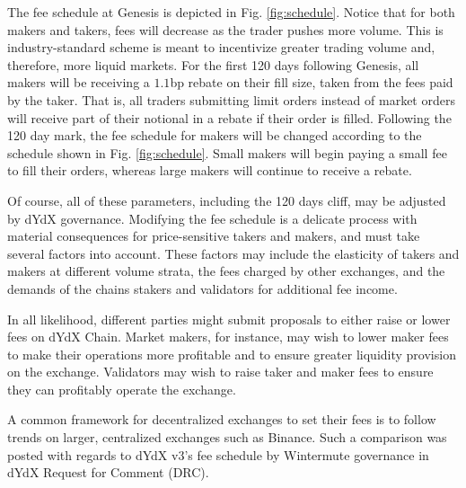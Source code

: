             The fee schedule at Genesis is depicted in Fig. \ref{fig:schedule}. Notice that for both makers and takers, fees will decrease as the trader pushes more volume. This is industry-standard scheme is meant to incentivize greater trading volume and, therefore, more liquid markets. For the first 120 days following Genesis, all makers will be receiving a $1.1$bp rebate on their fill size, taken from the fees paid by the taker. That is, all traders submitting limit orders instead of market orders will receive part of their notional in a rebate if their order is filled. Following the 120 day mark, the fee schedule for makers will be changed according to the schedule shown in Fig. \ref{fig:schedule}. Small makers will begin paying a small fee to fill their orders, whereas large makers will continue to receive a rebate.

            Of course, all of these parameters, including the 120 days cliff, may be adjusted by dYdX governance. Modifying the fee schedule is a delicate process with material consequences for price-sensitive takers and makers, and must take several factors into account. These factors may include the elasticity of takers and makers at different volume strata, the fees charged by other exchanges, and the demands of the chains stakers and validators for additional fee income. 

            In all likelihood, different parties might submit proposals to either raise or lower fees on dYdX Chain. Market makers, for instance, may wish to lower maker fees to make their operations more profitable and to ensure greater liquidity provision on the exchange. Validators may wish to raise taker and maker fees to ensure they can profitably operate the exchange.

            A common framework for decentralized exchanges to set their fees is to follow trends on larger, centralized exchanges such as Binance. Such a comparison was posted with regards to dYdX v3's fee schedule by Wintermute governance in  dYdX Request for Comment (DRC).

